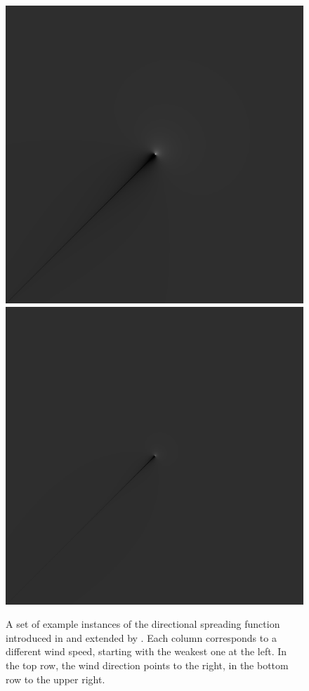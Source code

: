 \begin{figure}
{ }
 \hfill
 \subtop
 {
 \includegraphics[scale=0.25]{figures/mitsuyasu_dfilt_wur_sqrt50.png}
 }
 \hfill
 \subtop
 {
 \includegraphics[scale=0.25]{figures/mitsuyasu_dfilt_wur_sqrt200.png}
 }
\caption{A set of example instances of the directional spreading function
introduced in \citet{article:Mitsuyasu1975} and extended by
\citet{article:Hasselmann1980}.
Each column corresponds to a different wind speed, starting with the weakest
one at the left. In the top row, the wind direction points to the right, in the
bottom row to the upper right.}
\label{fig:directional_filter}
\end{figure}
